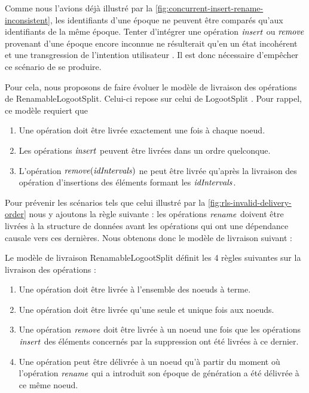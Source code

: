 Comme nous l'avions déjà illustré par la \autoref{fig:concurrent-insert-rename-inconsistent}, les identifiants d'une époque ne peuvent être comparés qu'aux identifiants de la même époque.
Tenter d'intégrer une opération $\mathit{insert}$ ou $\mathit{remove}$ provenant d'une époque encore inconnue ne résulterait qu'en un état incohérent et une transgression de l'intention utilisateur .
Il est donc nécessaire d'empêcher ce scénario de se produire.

Pour cela, nous proposons de faire évoluer le modèle de livraison des opérations de RenamableLogootSplit.
Celui-ci repose sur celui de LogootSplit .
Pour rappel, ce modèle requiert que
\begin{enumerate}
  \item Une opération doit être livrée exactement une fois à chaque noeud.
  \item Les opérations $\mathit{insert}$ peuvent être livrées dans un ordre quelconque.
  \item L'opération $\mathit{remove}(\mathit{idIntervals})$ ne peut être livrée qu'après la livraison des opération d'insertions des éléments formant les $\mathit{idIntervals}$.
\end{enumerate}

Pour prévenir les scénarios tels que celui illustré par la \autoref{fig:rls-invalid-delivery-order} nous y ajoutons la règle suivante : les opérations $\mathit{rename}$ doivent être livrées à la structure de données avant les opérations qui ont une dépendance causale vers ces dernières.
Nous obtenons donc le modèle de livraison suivant :

\begin{definition}
  \label{def:rls-delivery-model}
  Le modèle de livraison RenamableLogootSplit définit les 4 règles suivantes sur la livraison des opérations :
  \begin{enumerate}
    \item Une opération doit être livrée à l'ensemble des noeuds à terme.
    \item Une opération doit être livrée qu'une seule et unique fois aux noeuds.
    \item Une opération $\mathit{remove}$ doit être livrée à un noeud une fois que les opérations $\mathit{insert}$ des éléments concernés par la suppression ont été livrées à ce dernier.
    \item Une opération peut être délivrée à un noeud qu'à partir du moment où l'opération $\mathit{rename}$ qui a introduit son époque de génération a été délivrée à ce même noeud.
  \end{enumerate}
\end{definition}

